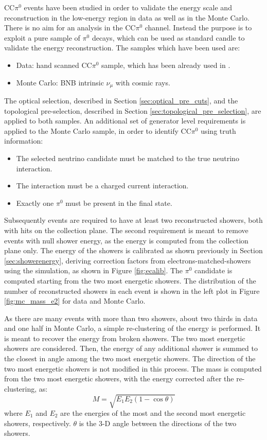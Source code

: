 CC$\pi^0$ events have been studied in order to validate the energy scale and reconstruction in the low-energy region in data as well as in the Monte Carlo. There is no aim for an analysis in the CC$\pi^0$ channel. Instead the purpose is to exploit a pure sample of $\pi^0$ decays, which can be used as standard candle to validate the energy reconstruction.
The samples which have been used are:
\begin{itemize}
  \item Data: hand scanned CC$\pi^0$ sample, which has been already used in \cite{caratelli}.
  \item Monte Carlo: BNB intrinsic $\nu_{\mu}$ with cosmic rays.
\end{itemize}
The optical selection, described in Section \ref{sec:optical_pre_cuts}, and the topological pre-selection, described in Section \ref{sec:topological_pre_selection}, are applied to both samples.
An additional set of generator level requirements is applied to the Monte Carlo sample, in order to identify CC$\pi^0$ using truth information:
\begin{itemize}
    \item The selected neutrino candidate must be matched to the true neutrino interaction.
    \item The interaction must be a charged current interaction.
    \item Exactly one $\pi^0$ must be present in the final state.
\end{itemize}
Subsequently events are required to have at least two reconstructed showers, both with hits on the collection plane. The second requirement is meant to remove events with null shower energy, as the energy is computed from the collection plane only. The energy of the showers is calibrated as shown previously in Section \ref{sec:showerenergy}, deriving correction factors from electrons-matched-showers using the simulation, as shown in Figure \ref{fig:ecalib}.
The $\pi^0$ candidate is computed starting from the two most energetic showers. The distribution of the number of reconstructed showers in each event is shown in the left plot in Figure \ref{fig:mc_mass_e2} for data and Monte Carlo.

As there are many events with more than two showers, about two thirds in data and one half in Monte Carlo, a simple re-clustering of the energy is performed. It is meant to recover the energy from broken showers. The two most energetic showers are considered. Then, the energy of any additional shower is summed to the closest in angle among the two most energetic showers. The direction of the two most energetic showers is not modified in this process. The mass is computed from the two most energetic showers, with the energy corrected after the re-clustering, as:
\[ M = \sqrt{E_1 E_2 (1 - \cos\theta)} \]
where $E_1$ and $E_2$ are the energies of the most and the second most energetic showers, respectively. $\theta$ is the 3-D angle between the directions of the two showers.

